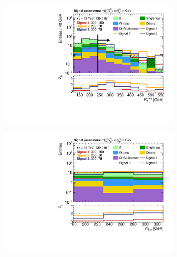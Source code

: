 \begin{figure}
	\centering
	\begin{subfigure}[b]{0.45\linewidth}
		\centering\includegraphics[width=\textwidth]{n1_SRLM_mct_bins/met.pdf}
		\vspace{-2em}
		\caption{\label{fig:Wh_reopt_second_round_n1_srlm_met}}
	\end{subfigure}%
	\begin{subfigure}[b]{0.45\linewidth}
		\centering\includegraphics[width=\textwidth]{n1_SRLM_mct_bins/mct.pdf}
		\vspace{-2em}
		\caption{\label{fig:Wh_reopt_second_round_n1_srlm_mct}}
	\end{subfigure}
	\par\medskip
	\begin{subfigure}[b]{0.45\linewidth}

\end{subfigure}
\end{figure}
